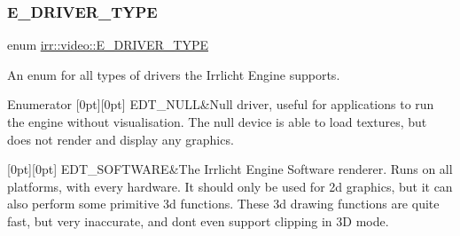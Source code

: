 \subsubsection{\texorpdfstring{E\+\_\+\+D\+R\+I\+V\+E\+R\+\_\+\+T\+Y\+PE}{E\_DRIVER\_TYPE}\hspace{0.1cm}{\footnotesize\ttfamily [2/2]}}
{\footnotesize\ttfamily enum \hyperlink{namespaceirr_1_1video_ae35a6de6d436c76107ad157fe42356d0}{irr\+::video\+::\+E\+\_\+\+D\+R\+I\+V\+E\+R\+\_\+\+T\+Y\+PE}}



An enum for all types of drivers the Irrlicht Engine supports. 

\begin{DoxyEnumFields}{Enumerator}
[0pt][0pt]{}\mbox{\label{namespaceirr_1_1video_ae35a6de6d436c76107ad157fe42356d0a847cc228389396d6228c00aadf461ecb}} 
E\+D\+T\+\_\+\+N\+U\+LL&Null driver, useful for applications to run the engine without visualisation. The null device is able to load textures, but does not render and display any graphics. \\
\hline

[0pt][0pt]{}\mbox{\label{namespaceirr_1_1video_ae35a6de6d436c76107ad157fe42356d0ad863d9225d42c1f9ea1eb7ad89a712ce}} 
E\+D\+T\+\_\+\+S\+O\+F\+T\+W\+A\+RE&The Irrlicht Engine Software renderer. Runs on all platforms, with every hardware. It should only be used for 2d graphics, but it can also perform some primitive 3d functions. These 3d drawing functions are quite fast, but very inaccurate, and don\textquotesingle{}t even support clipping in 3D mode. \\
\hline


\end{DoxyEnumFields}
